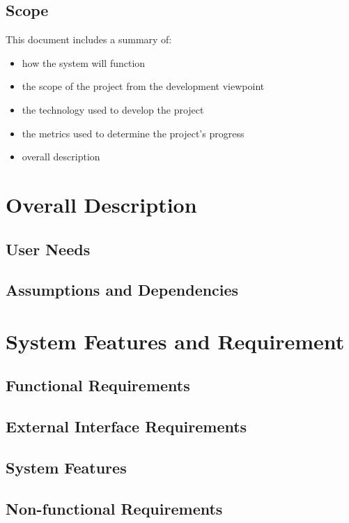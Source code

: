 \documentclass[a4paper]{article}
\begin{document}
    \subsection{Scope}
    This document includes a summary of:
    \begin{itemize}
        \item how the system will function
        \item the scope of the project from the development viewpoint
        \item the technology used to develop the project
        \item the metrics used to determine the project's progress
        \item overall description
    \end{itemize}
    \section{Overall Description}
    \subsection{User Needs}
    \subsection{Assumptions and Dependencies}
    \section{System Features and Requirement}
    \subsection{Functional Requirements}
    \subsection{External Interface Requirements}
    \subsection{System Features}
    \subsection{Non-functional Requirements}
\end{document}
